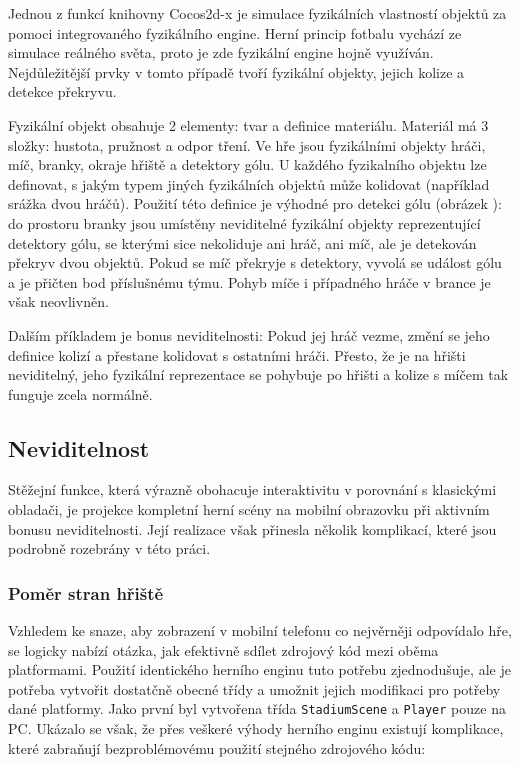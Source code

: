 \documentclass[thesis=B,czech,hidelinks]{FITthesis}[2012/06/26] %
\newcommand{\code}[1]{\texttt{#1}}
\begin{document}
Jednou z funkcí knihovny Cocos2d-x je simulace fyzikálních vlastností objektů za pomoci integrovaného fyzikálního engine. Herní princip fotbalu vychází ze simulace reálného světa, proto je zde fyzikální engine hojně využíván. Nejdůležitější prvky v tomto případě tvoří fyzikální objekty, jejich kolize a detekce překryvu.

Fyzikální objekt obsahuje 2 elementy: tvar a definice materiálu. Materiál má 3 složky: hustota, pružnost a odpor tření. Ve hře jsou fyzikálními objekty hráči, míč, branky, okraje hřiště a detektory gólu. U každého fyzikalního objektu lze definovat, s jakým typem jiných fyzikálních objektů může kolidovat (například srážka dvou hráčů). Použití této definice je výhodné pro detekci gólu (obrázek ): do prostoru branky jsou umístěny neviditelné fyzikální objekty reprezentující detektory gólu, se kterými sice nekoliduje ani hráč, ani míč, ale je detekován překryv dvou objektů. Pokud se míč překryje s detektory, vyvolá se událost gólu a je přičten bod příslušnému týmu. Pohyb míče i případného hráče v brance je však neovlivněn.

Dalším příkladem je bonus neviditelnosti: Pokud jej hráč vezme, změní se jeho definice kolizí a přestane kolidovat s ostatními hráči. Přesto, že je na hřišti neviditelný, jeho fyzikální reprezentace se pohybuje po hřišti a kolize s míčem tak funguje zcela normálně.

\subsection{Neviditelnost}

Stěžejní funkce, která výrazně obohacuje interaktivitu v porovnání s klasickými obladači, je projekce kompletní herní scény na mobilní obrazovku při aktivním bonusu neviditelnosti. Její realizace však přinesla několik komplikací, které jsou podrobně rozebrány v této práci. 

\subsubsection{Poměr stran hřiště}

Vzhledem ke snaze, aby zobrazení v mobilní telefonu co nejvěrněji odpovídalo hře, se logicky nabízí otázka, jak efektivně sdílet zdrojový kód mezi oběma platformami. Použití identického herního enginu tuto potřebu zjednodušuje, ale je potřeba vytvořit dostatčně obecné třídy a umožnit jejich modifikaci pro potřeby dané platformy. Jako první byl vytvořena třída \code{StadiumScene} a \code{Player} pouze na PC. Ukázalo se však, že přes veškeré výhody herního enginu existují komplikace, které zabraňují bezproblémovému použití stejného zdrojového kódu:
\end{document}
